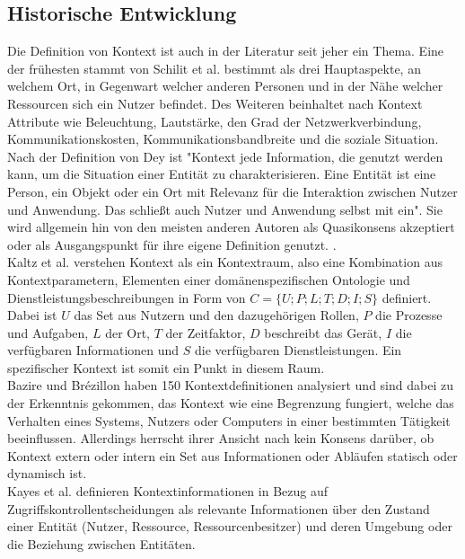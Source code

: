 \subsection{Historische Entwicklung}
Die Definition von Kontext ist auch in der Literatur seit jeher ein Thema.
Eine der frühesten stammt von Schilit et al.\cite{schilit_context-aware_1994} bestimmt als drei Hauptaspekte, an welchem Ort, in Gegenwart welcher anderen Personen und in der Nähe welcher Ressourcen sich ein Nutzer befindet. Des Weiteren beinhaltet nach \cite{schilit_context-aware_1994} Kontext Attribute wie Beleuchtung, Lautstärke, den Grad der Netzwerkverbindung, Kommunikationskosten, Kommunikationsbandbreite und die soziale Situation. Nach der Definition von Dey \cite{dey_understanding_2001} ist "Kontext jede Information, die genutzt werden kann, um die Situation einer Entität zu charakterisieren. Eine Entität ist eine Person, ein Objekt oder ein Ort mit Relevanz für die Interaktion zwischen Nutzer und Anwendung. Das schließt auch Nutzer und Anwendung selbst mit ein". Sie wird allgemein hin von den meisten anderen Autoren als Quasikonsens akzeptiert \cite{wei_liu_survey_2011,alegre_engineering_2016,aguilar_cameonto_2018} oder als Ausgangspunkt für ihre eigene Definition genutzt. \cite{kokinov_operational_2007,kayes_icaf_2012}.\\
Kaltz et al. \cite{wolfgang_kaltz_context-aware_2005} verstehen Kontext als ein Kontextraum, also eine Kombination aus Kontextparametern, Elementen einer domänenspezifischen Ontologie und Dienstleistungsbeschreibungen in Form von $C = \{U;P;L;T;D;I;S\}$ definiert.
Dabei ist $U$ das Set aus Nutzern und den dazugehörigen Rollen, $P$ die Prozesse und Aufgaben,  $L$ der Ort,  $T$ der Zeitfaktor,  $D$ beschreibt das Gerät, $I$ die verfügbaren Informationen und $S$ die verfügbaren Dienstleistungen. Ein spezifischer Kontext ist somit ein Punkt in diesem Raum.\\
Bazire und Brézillon \cite{hutchison_understanding_2005} haben 150 Kontextdefinitionen analysiert und sind dabei zu der Erkenntnis gekommen, das Kontext wie eine Begrenzung fungiert, welche das Verhalten eines Systems, Nutzers oder Computers in einer bestimmten Tätigkeit beeinflussen.
Allerdings herrscht ihrer Ansicht nach kein Konsens darüber, ob Kontext extern oder intern ein Set aus Informationen oder Abläufen statisch oder dynamisch ist.\\
Kayes et al.\cite{kayes_icaf_2012} definieren Kontextinformationen in Bezug auf Zugriffskontrollentscheidungen als relevante Informationen über den Zustand einer Entität (Nutzer, Ressource, Ressourcenbesitzer) und deren Umgebung oder die Beziehung zwischen Entitäten.
